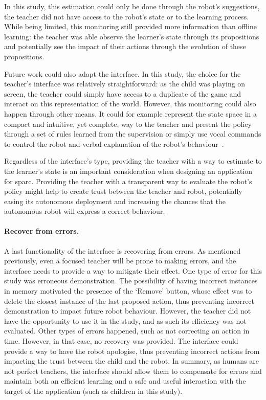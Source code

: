 In this study, this estimation could only be done through the robot's suggestions, the teacher did not have access to the robot's state or to the learning process. While being limited, this monitoring still provided more information than offline learning: the teacher was able observe the learner's state through its propositions and potentially see the impact of their actions through the evolution of these propositions.

Future work could also adapt the interface. In this study, the choice for the teacher's interface was relatively straightforward: as the child was playing on screen, the teacher could simply have access to a duplicate of the game and interact on this representation of the world. However, this monitoring could also happen through other means. It could for example represent the state space in a compact and intuitive, yet complete, way to the teacher and present the policy through a set of rules learned from the supervision or simply use vocal commands to control the robot and verbal explanation of the robot's behaviour~\citep{hayes2017improving}.

Regardless of the interface's type, providing the teacher with a way to estimate to the learner's state is an important consideration when designing an application for \gls{sparc}. Providing the teacher with a transparent way to evaluate the robot's policy might help to create trust between the teacher and robot, potentially easing its autonomous deployment and increasing the chances that the autonomous robot will express a correct behaviour.

\paragraph{Recover from errors.}

A last functionality of the interface is recovering from errors. As mentioned previously, even a focused teacher will be prone to making errors, and the interface needs to provide a way to mitigate their effect. One type of error for this study was erroneous demonstration. The possibility of having incorrect instances in memory motivated the presence of the `Remove' button, whose effect was to delete the closest instance of the last proposed action, thus preventing incorrect demonstration to impact future robot behaviour. However, the teacher did not have the opportunity to use it in the study, and as such its efficiency was not evaluated. Other types of errors happened, such as not correcting an action in time. However, in that case, no recovery was provided. The interface could provide a way to have the robot apologise, thus preventing incorrect actions from impacting the trust between the child and the robot. In summary, as humans are not perfect teachers, the interface should allow them to compensate for errors and maintain both an efficient learning and a safe and useful interaction with the target of the application (such as children in this study).

